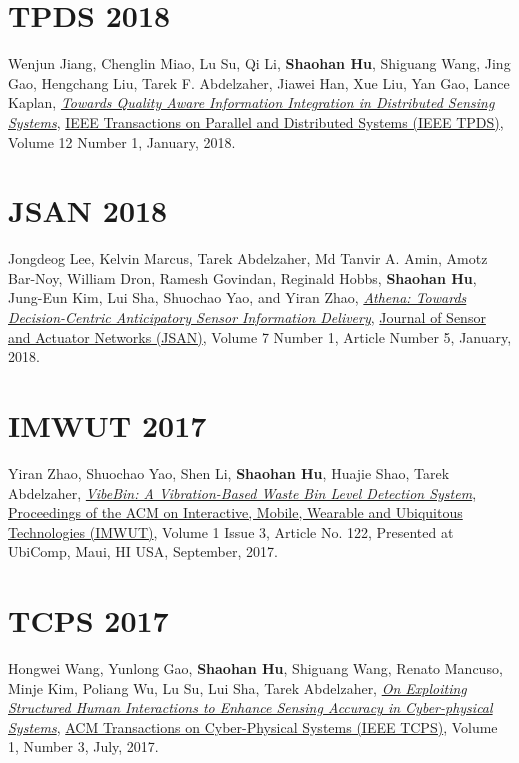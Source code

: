 \section{\sc TPDS 2018}\hypertarget{jiang2018tpds}{}
Wenjun Jiang, Chenglin Miao, Lu Su, Qi Li, \textbf{Shaohan Hu}, Shiguang Wang, Jing Gao, Hengchang Liu, Tarek F. Abdelzaher, Jiawei Han, Xue Liu, Yan Gao, Lance Kaplan,
\href{http://ieeexplore.ieee.org/document/7940106/}{\emph{Towards Quality Aware Information Integration in Distributed Sensing Systems}},
\href{https://www.computer.org/web/tpds}{\textsf{IEEE Transactions on Parallel and Distributed Systems (IEEE TPDS)}},
Volume 12 Number 1, January, 2018.

\section{\sc JSAN 2018}\hypertarget{lee2018jsan}{}
Jongdeog Lee, Kelvin Marcus, Tarek Abdelzaher, Md Tanvir A. Amin, Amotz Bar-Noy, William Dron, Ramesh Govindan, Reginald Hobbs, \textbf{Shaohan Hu}, Jung-Eun Kim, Lui Sha, Shuochao Yao, and Yiran Zhao,
\href{http://www.mdpi.com/2224-2708/7/1/5/htm}{\emph{Athena: Towards Decision-Centric Anticipatory Sensor Information Delivery}},
\href{http://www.mdpi.com/journal/jsan}{\textsf{Journal of Sensor and Actuator Networks (JSAN)}},
Volume 7 Number 1, Article Number 5, January, 2018.

\section{\sc IMWUT 2017}\hypertarget{zhao2017imwut}{}
Yiran Zhao, Shuochao Yao, Shen Li, \textbf{Shaohan Hu}, Huajie Shao, Tarek Abdelzaher,
\href{https://dl.acm.org/citation.cfm?id=3132027}{\emph{VibeBin: A Vibration-Based Waste Bin Level Detection System}},
\href{https://imwut.acm.org/}{\textsf{Proceedings of the ACM on Interactive, Mobile, Wearable and Ubiquitous Technologies (IMWUT)}},
Volume 1 Issue 3, Article No. 122, Presented at UbiComp, Maui, HI USA, September, 2017.

\section{\sc TCPS 2017}\hypertarget{wang2017tcps}{}
Hongwei Wang, Yunlong Gao, \textbf{Shaohan Hu}, Shiguang Wang, Renato Mancuso, Minje Kim, Poliang Wu, Lu Su, Lui Sha, Tarek Abdelzaher,
\href{http://dl.acm.org/citation.cfm?id=3064006}{\emph{On Exploiting Structured Human Interactions to Enhance Sensing Accuracy in Cyber-physical Systems}},
\href{http://tcps.acm.org/}{\textsf{ACM Transactions on Cyber-Physical Systems (IEEE TCPS)}},
Volume 1, Number 3, July, 2017.

